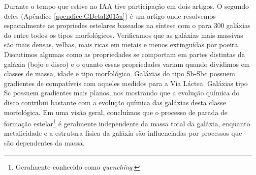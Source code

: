 Durante o tempo que estive no IAA tive participação em dois artigos. O segundo deles
\citep{GonzalezDelgado.etal.2015a} (Apêndice \ref{apendice:GDetal2015a}) é um artigo onde
resolvemos espacialmente as propriedes estelares baseados na síntese com o \starlight para 300
galáxias do \CAL entre todos os tipos morfológicos. Verificamos que as galáxias mais massivas são
mais densas, velhas, mais ricas em metais e menos extinguídas por poeira. Discutimos algumas como as
propriedades se comportam em partes distintas da galáxia (bojo e disco) e o quanto essas
propriedades variam quando dividimos em classes de massa, idade e tipo morfológico. Galáxias do tipo
Sb-Sbc possuem gradientes de  compatíveis com aqueles medidos para a Via Láctea.
Galáxias tipo Sc possuem gradientes mais planos, nos mostrando que a evolução química do disco
contribui bastante com a evolução química das galáxias desta classe morfológica. Em uma visão geral,
concluímos que o processo de parada de formação estelar\footnote{Geralmente conhecido como {\em
quenching}.} é geralmente independente da massa total da galáxia, enquanto metalicidade e a
estrutura física da galáxia são influenciadas por processos que são dependentes da massa.




